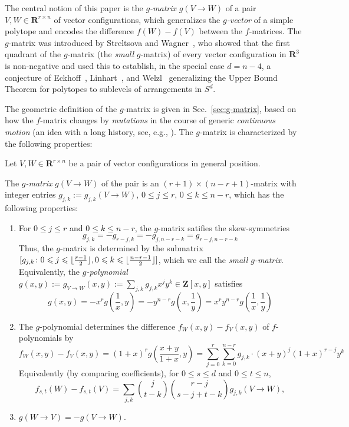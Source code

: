 \documentclass[a4paper,USenglish,cleveref, autoref, thm-restate,nolineno]{socg-lipics-v2021}
\renewcommand{\leq}{\leqslant}
\newcommand{\R}{\mathbf{R}}
\newcommand{\Z}{\mathbf{Z}}
\DeclarePairedDelimiter\floor{\lfloor}{\rfloor}
\begin{document}
The central notion of this paper is the \emph{$g$-matrix} $g(V\to W)$ of a pair $V,W \in \R^{r\times n}$ of vector configurations, which generalizes the \emph{$g$-vector} of a simple polytope and encodes the difference $f(W)-f(V)$ between the $f$-matrices. The $g$-matrix was introduced by Streltsova and Wagner~\cite{SW:Arcs}, who showed that the first quadrant of the $g$-matrix (the \emph{small} $g$-matrix) of every vector configuration in $\R^3$ is non-negative and used this to establish, in the special case $d=n-4$, a conjecture of Eckhoff~\cite{Eckhoff:1993aa}, Linhart~\cite{Linhart:1994aa}, and Welzl~\cite{Welzl:2001aa} generalizing the Upper Bound Theorem for polytopes to sublevels of arrangements in $S^d$.

The geometric definition of the $g$-matrix is given in Sec.~\ref{sec:g-matrix}, based on how the $f$-matrix changes by \emph{mutations} in the course of generic \emph{continuous motion} (an idea with a long history, see, e.g., \cite{Andrzejak:1998aa}). The $g$-matrix is characterized by the following properties:
\begin{theorem} 
\label{thm:f-g}
Let $V,W \in \R^{r\times n}$ be a pair of vector configurations in general position. 

The \emph{$g$-matrix} $g(V\to W)$ of the pair is an $(r+1)\times (n-r+1)$-matrix  with integer entries $g_{j,k}:=g_{j,k}(V\to W)$, $0\leq j\leq r$, $0\leq k \leq n-r$, which has the following properties:  
\begin{enumerate}
\item For $0\leq j\leq r$ and $0\leq k\leq n-r$, the $g$-matrix satifies the skew-symmetries
\begin{equation}
\label{eq:g-skew}
g_{j,k}=-g_{r-j,k}=-g_{j,n-r-k}=g_{r-j,n-r-k}
\end{equation}
Thus, the $g$-matrix is determined by the submatrix $[g_{j,k}\colon 0\leq j \leq \floor{\frac{r-1}{2}}, 0\leq k \leq \floor{\frac{n-r-1}{2}}]$, which we call the \emph{small $g$-matrix}. 
Equivalently, the \emph{$g$-polynomial} $g(x,y):=g_{V\to W}(x,y):=\sum_{j,k} g_{j,k} x^j y^k \in \Z[x,y]$ satisfies
\begin{equation}
\label{eq:g-poly-skew}
\textstyle g(x,y)=-x^rg(\frac{1}{x},y)=-y^{n-r}g(x,\frac{1}{y})=x^ry^{n-r}g(\frac{1}{x},\frac{1}{y})
\end{equation}
\item The $g$-polynomial determines the difference $f_W(x,y)-f_V(x,y)$ of $f$-polynomials by
\begin{equation}
\label{eq:f-poly-g-poly}
f_W(x,y)-f_V(x,y) = (1+x)^r g (\textstyle \frac{x+y}{1+x},y)=\sum_{j=0}^r \sum_{k=0}^{n-r} g_{j,k}\cdot (x+y)^j (1+x)^{r-j} y^k
\end{equation}
Equivalently (by comparing coefficients), for $0\leq s\leq d$ and $0\leq t\leq n$,
\begin{equation}
\label{eq:f-g-coefficients}
f_{s,t}(W)-f_{s,t}(V) = \sum_{j,k} \binom{j}{t-k}\binom{r-j}{s-j+t-k} g_{j,k}(V\to W),
\end{equation}
\item $g(W\to V)=-g(V\to W)$.
\end{enumerate}
\end{theorem}
\end{document}

